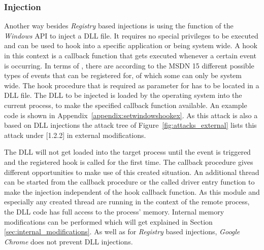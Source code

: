 \subsubsection{ Injection}
Another way besides \emph{Registry} based injections is using the  function of the \emph{Windows} \gls{API} to inject a \gls{DLL} file. It requires no special privileges to be executed and can be used to  hook into a specific application or being system wide. A hook in this context is a callback function that gets executed whenever a certain event is occurring. In terms of , there are according to the \gls{MSDN} \cite{msdn_setwindowshookex} 15 different possible types of events that can be registered for, of which some can only be system wide. The hook procedure that is required as parameter for  has to be located in a \gls{DLL} file. The \gls{DLL} to be injected is loaded by the operating system into the current process, to make the specified callback function available. An example code is shown in Appendix~\ref{appendix:setwindowshookex}. As this attack is also a based on \gls{DLL} injections the attack tree of Figure~\ref{fig:attacks_external} lists this attack under [1.2.2] in external modifications. 

\medskip

The \gls{DLL} will not get loaded into the target process until the event is triggered and the registered hook is called for the first time. The callback procedure gives different opportunities to make use of this created situation. An additional thread can be started from the callback procedure or the called driver entry function to make the injection independent of the hook callback function. As this module and especially any created thread are running in the context of the remote process, the \gls{DLL} code has full access to the process' memory. Internal memory modifications can be performed which will get explained in Section \ref{sec:internal_modifications}. As well as for \emph{Registry} based injections, \emph{Google Chrome} does not prevent  \gls{DLL} injections.